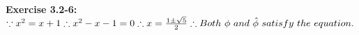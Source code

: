 \documentclass{article}
\begin{document}
\begin{spacing}{2.0}
\noindent
\textbf{Exercise 3.2-6:}\\
$
\because x ^ 2 = x + 1\\
\therefore x ^ 2 - x - 1 = 0\\
\therefore x = \frac{1 \pm \sqrt{5}}{2}\\
\therefore Both\ \phi\ and\ \hat{\phi}\ satisfy\ the\ equation.\\
$
\end{spacing}
\end{document}
